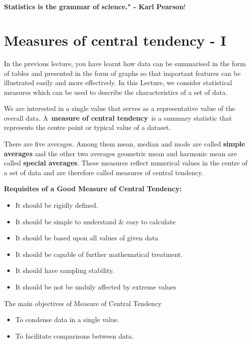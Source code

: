 \documentclass[
]{book}
\begin{document}
~\\
\hspace*{0.333em}\\
\hspace*{0.333em}

\hypertarget{hello}{}
\textbf{Statistics is the grammar of science." - Karl Pearson}!

\hypertarget{measures-of-central-tendency---i}{%
\chapter{Measures of central tendency - I}\label{measures-of-central-tendency---i}}

In the previous lecture, you have learnt how data can be summarised in
the form of tables and presented in the form of graphs so that important
features can be illustrated easily and more effectively. In this
Lecture, we consider statistical measures which can be used to describe
the characteristics of a set of data.

We are interested in a single value that serves as a representative
value of the overall data. A~\textbf{measure of central tendency}~is a
summary statistic that represents the centre point or typical value of a
dataset.

There are five averages. Among them mean, median and mode are called
\textbf{simple averages} and the other two averages geometric mean and harmonic
mean are called \textbf{special averages}. These measures reflect numerical
values in the centre of a set of data and are therefore called measures
of central tendency.

{\textbf{Requisites of a Good Measure of Central Tendency:}}

\begin{itemize}
\item
  It should be rigidly defined.
\item
  It should be simple to understand \& easy to calculate
\item
  It should be based upon all values of given data
\item
  It should be capable of further mathematical treatment.
\item
  It should have sampling stability.
\item
  It should be not be unduly affected by extreme values
\end{itemize}

{The main objectives of Measure of Central Tendency}

\begin{itemize}
\item
  To condense data in a single value.
\item
  To facilitate comparisons between data.
\end{itemize}
\end{document}
